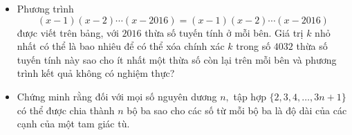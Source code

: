 \documentclass[11pt]{scrartcl}
\begin{document}
\begin{itemize}[label=, leftmargin=0em, itemsep=-0em]
\begin{btvn}
        (a) Chứng minh rằng đối với tất cả các số nguyên $n\ge 3$, tồn tại một tập hợp cân bằng gồm $n$ điểm.
        
        (b) Xác định tất cả các số nguyên $n\ge 3$ cho phép tồn tại một tập hợp cân bằng không chứa trung tâm gồm $n$ điểm.
    \end{btvn}

    \item \begin{btvn}
        Phương trình
$$(x-1)(x-2)\cdots(x-2016)=(x-1)(x-2)\cdots (x-2016)$$
được viết trên bảng, với $2016$ thừa số tuyến tính ở mỗi bên. Giá trị $k$ nhỏ nhất có thể là bao nhiêu để có thể xóa chính xác $k$ trong số $4032$ thừa số tuyến tính này sao cho ít nhất một thừa số còn lại trên mỗi bên và phương trình kết quả không có nghiệm thực?
    \end{btvn}

    \item \begin{btvn}
        Chứng minh rằng đối với mọi số nguyên dương $n,$ tập hợp $\{2,3,4,\ldots,3n+1\}$ có thể được chia thành $n$ bộ ba sao cho các số từ mỗi bộ ba là độ dài của các cạnh của một tam giác tù.
    \end{btvn}


\end{itemize}
\end{document}
